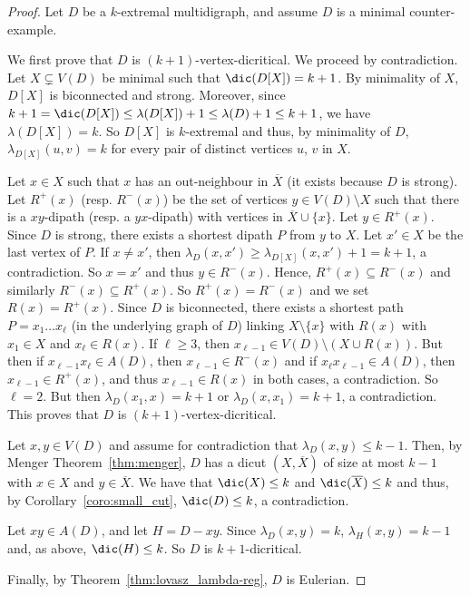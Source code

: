 \begin{proof}
    Let $D$ be a $k$-extremal multidigraph, and assume $D$ is a minimal counter-example. 

    We first prove that $D$ is $(k+1)$-vertex-dicritical. 
    We proceed by contradiction. Let $X \subsetneq V(D)$ be minimal such that $\dic(D[X]) =k+1$. By minimality of $X$, $D[X]$ is biconnected and strong. 
    Moreover, since  $k+1 = \dic(D[X]) \leq \lambda(D[X]) + 1 \leq \lambda(D)+1 \leq  k+1$, we have $\lambda(D[X]) = k$. 
    So $D[X]$ is $k$-extremal and thus, by minimality of $D$, $\lambda_{D[X]}(u,v)=k$ for every pair of distinct vertices $u$, $v$ in $X$.    
    
    Let $x \in X$ such that $x$ has an out-neighbour in $\overline{X}$ (it exists because $D$ is strong). Let $R^+(x)$ (resp. $R^-(x)$) be the set of vertices $y \in V(D) \setminus X$ such that there is a $xy$-dipath (resp. a $yx$-dipath) with vertices in $\overline{X} \cup \{x\}$. 
    Let $y \in R^+(x)$. Since $D$ is strong, there exists a shortest dipath $P$ from $y$ to $X$. Let $x' \in X$ be the last vertex of $P$. If $x \neq x'$, then $\lambda_D(x,x') \geq \lambda_{D[X]}(x,x')+1 = k+1$, a contradiction. So $x=x'$ and thus $y \in R^-(x)$.  Hence, $R^+(x) \subseteq R^-(x)$ and similarly $R^-(x) \subseteq R^+(x)$. So $R^+(x) = R^-(x)$ and we set $R(x)= R^+(x)$. 
    Since $D$ is biconnected, there exists a shortest path $P=x_1\dots x_{\ell}$ (in the underlying graph of $D$) linking $X\setminus \{x\}$ with $R(x)$ with $x_1 \in X$ and $x_{\ell} \in R(x)$.
    If $\ell \geq 3$, then $x_{\ell-1} \in V(D) \setminus (X \cup R(x))$. But then if $x_{\ell - 1}x_{\ell} \in A(D)$, then $x_{\ell - 1} \in R^-(x)$ and if $x_{\ell} x_{\ell - 1} \in A(D)$, then $x_{\ell - 1} \in R^+(x)$, and thus $x_{\ell-1} \in R(x)$ in both cases, a contradiction. So $\ell =2$. 
    But then $\lambda_D(x_1,x) = k+1$ or $\lambda_D(x,x_1)=k+1$, a contradiction. 
    This proves that $D$ is $(k+1)$-vertex-dicritical. 
    \medskip

    Let $x,y \in V(D)$ and assume for contradiction that $\lambda_D(x,y) \leq k-1$. Then, by Menger Theorem~\ref{thm:menger}, $D$ has a dicut $(X, \overline{X})$ of size at most $k-1$ with $x \in X$ and $y \in \overline{X}$.  %
    We have that $\dic(X) \leq k$ and $\dic(\overline{X}) \leq k$ and thus, by Corollary~\ref{coro:small_cut}, $\dic(D) \leq k$, a contradiction. 

    Let $xy \in A(D)$, and let $H= D - xy$. Since $\lambda_D(x,y) = k$, $\lambda_H(x,y) =k-1$ and, as above, $\dic(H) \leq k$. So $D$ is $k+1$-dicritical. 
    
    Finally, by Theorem~\ref{thm:lovasz_lambda-reg}, $D$ is Eulerian. 
\end{proof}

